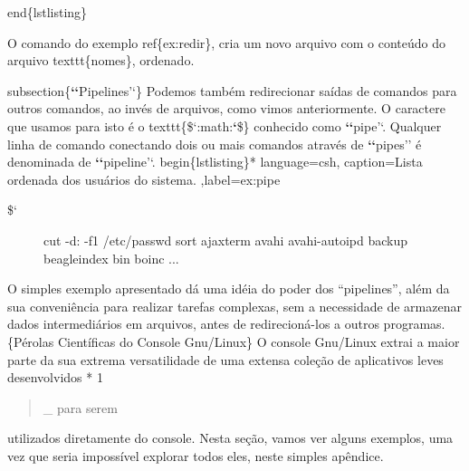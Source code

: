 \documentclass[a4paper,10pt,portuguese]{sphinxmanual}
\begin{document}
end\{lstlisting\}

O comando do exemplo ref\{ex:redir\}, cria um novo arquivo com o conteúdo do arquivo texttt\{nomes\}, ordenado.

subsection\{{\color{red}\bfseries{}{}`{}`}Pipelines'`\}
Podemos também redirecionar saídas de comandos para outros comandos, ao invés de arquivos, como vimos anteriormente. O caractere que usamos para isto é o texttt\{\${}`:math:{\color{red}\bfseries{}{}`}\$\} conhecido como {\color{red}\bfseries{}{}`{}`}pipe'`. Qualquer linha de comando conectando dois ou mais comandos através de {\color{red}\bfseries{}{}`{}`}pipes'' é denominada de {\color{red}\bfseries{}{}`{}`}pipeline'`.
begin\{lstlisting\}* language=csh, caption=Lista ordenada dos usuários do sistema. ,label=ex:pipe
\begin{description}
\item[{\${}`}] \leavevmode
cut -d: -f1 /etc/passwd sort ajaxterm avahi avahi-autoipd backup
beagleindex bin boinc ...

\end{description}

O simples exemplo apresentado dá uma idéia do poder dos
``pipelines'', além da sua conveniência para realizar tarefas
complexas, sem a necessidade de armazenar dados intermediários em
arquivos, antes de redirecioná-los a outros programas.
\{Pérolas Científicas do Console Gnu/Linux\} O console Gnu/Linux
extrai a maior parte da sua extrema versatilidade de uma extensa
coleção de aplicativos leves desenvolvidos * 1
\begin{quote}

\_ para serem
\end{quote}

utilizados diretamente do console. Nesta seção, vamos ver alguns
exemplos, uma vez que seria impossível explorar todos eles, neste
simples apêndice.
\end{document}

